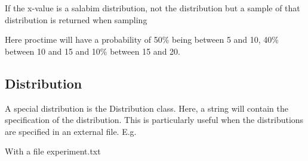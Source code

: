 \documentclass[letterpaper,10pt,english]{sphinxmanual}
\begin{document}
If the x-value is a salabim distribution, not the distribution but a sample of that distribution is returned when sampling

%
\begin{sphinxVerbatim}[commandchars=\\\{\}]
          
\end{sphinxVerbatim}

Here proctime will have a probability of 50\% being between 5 and 10, 40\% between 10 and 15 and 10\% between 15 and 20.


\subsection{Distribution}
\label{\detokenize{Distributions:distribution}}
A special distribution is the Distribution class. Here, a string will contain the specification of the distribution.
This is particularly useful when the distributions are specified in an external file. E.g.

%
\begin{sphinxVerbatim}[commandchars=\\\{\}]
    
      
      
      
\end{sphinxVerbatim}

With a file experiment.txt
\end{document}
